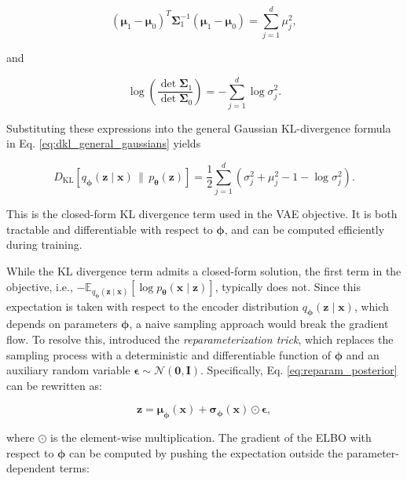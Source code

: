 \documentclass[10pt,twocolumn,article]{memoir}
\begin{document}
\begin{equation}
(\boldsymbol{\mu}_1-\boldsymbol{\mu}_0)^T
\boldsymbol{\Sigma}_1^{-1}
(\boldsymbol{\mu}_1-\boldsymbol{\mu}_0)
=
\sum_{j=1}^{d}\mu_j^2,
\end{equation}

and

\begin{equation}
\log\left(
\frac{\det\boldsymbol{\Sigma}_1}
     {\det\boldsymbol{\Sigma}_0}
\right)
=
-\sum_{j=1}^{d}\log\sigma_j^2.
\end{equation}

Substituting these expressions into the general Gaussian KL-divergence formula in Eq. \ref{eq:dkl_general_gaussians} yields

\begin{equation}
    D_{\mathrm{KL}} \left[ q_{\boldsymbol{\phi}}(\mathbf{z} \mid \mathbf{x}) \,\|\, p_{\boldsymbol{\theta}}(\mathbf{z}) \right] = \frac{1}{2} \sum_{j=1}^d \left( \sigma_j^2 + \mu_j^2 - 1 - \log \sigma_j^2 \right).
\end{equation}

This is the closed-form KL divergence term used in the VAE objective. It is both tractable and differentiable with respect to $\boldsymbol{\phi}$, and can be computed efficiently during training.

While the KL divergence term admits a closed-form solution, the first term in the objective, i.e., $- \mathbb{E}_{q_{\boldsymbol{\phi}}(\mathbf{z} \mid \mathbf{x})} [\log p_{\boldsymbol{\theta}}(\mathbf{x} \mid \mathbf{z})]$, typically does not. Since this expectation is taken with respect to the encoder distribution \( q_{\boldsymbol{\phi}}(\mathbf{z} \mid \mathbf{x}) \), which depends on parameters \( \boldsymbol{\phi} \), a naive sampling approach would break the gradient flow. To resolve this, \textcite{kingma2013auto} introduced the \textit{reparameterization trick}, which replaces the sampling process with a deterministic and differentiable function of $\boldsymbol{\phi}$ and an auxiliary random variable $\boldsymbol{\epsilon} \sim \mathcal{N}(\mathbf{0}, \mathbf{I})$. Specifically, Eq. \ref{eq:reparam_posterior} can be rewritten as:

\begin{equation}
    \mathbf{z} = \boldsymbol{\mu}_{\boldsymbol{\phi}}(\mathbf{x}) + \boldsymbol{\sigma}_{\boldsymbol{\phi}}(\mathbf{x}) \odot \boldsymbol{\epsilon},
\end{equation}

where $\odot$ is the element-wise multiplication. The gradient of the ELBO with respect to $\boldsymbol{\phi}$ can be computed by pushing the expectation outside the parameter-dependent terms:
\end{document}
